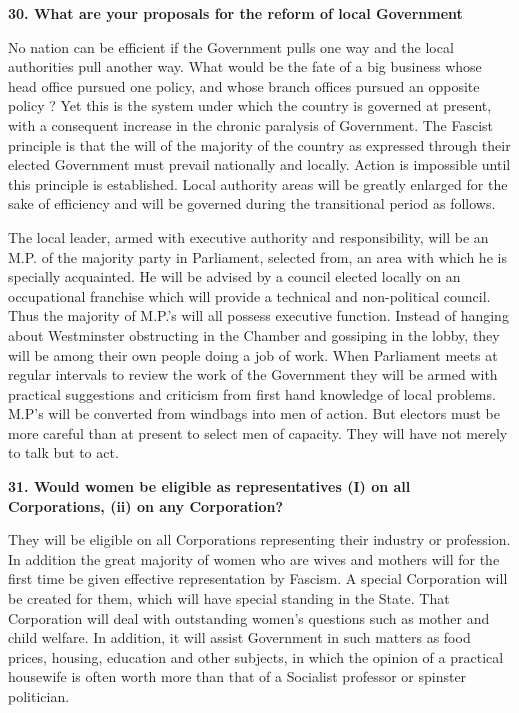\documentclass{book}
\begin{document}
\begin{flushleft}
    \textbf{30. What are your proposals for the reform of local Government}

No nation can be efficient if the Government pulls one way and the local authorities pull another
way. What would be the fate of a big business whose head office pursued one policy, and whose
branch offices pursued an opposite policy ? Yet this is the system under which the country is
governed at present, with a consequent increase in the chronic paralysis of Government. The
Fascist principle is that the will of the majority of the country as expressed through their elected
Government must prevail nationally and locally. Action is impossible until this principle is
established. Local authority areas will be greatly enlarged for the sake of efficiency and will be governed during the transitional period as follows.

The local leader, armed with executive authority and responsibility, will be an M.P. of the
majority party in Parliament, selected from, an area with which he is specially acquainted. He
will be advised by a council elected locally on an occupational franchise which will provide a
technical and non-political council. Thus the majority of M.P.'s will all possess executive
function. Instead of hanging about Westminster obstructing in the Chamber and gossiping in the lobby, they will be among their own people doing a job of work. When Parliament meets at regular intervals to review the work of the Government they will be armed with practical suggestions and criticism from first hand knowledge of local problems. M.P's will be converted from windbags into men of action. But electors must be more careful than at present to select men of capacity. They will have not merely to talk but to act.
\end{flushleft}

\begin{flushright}
    \textbf{31. Would women be eligible as representatives (I) on all Corporations, (ii) on any Corporation?}

They will be eligible on all Corporations representing their industry or profession. In addition the
great majority of women who are wives and mothers will for the first time be given effective
representation by Fascism. A special Corporation will be created for them, which will have
special standing in the State. That Corporation will deal with outstanding women's questions
such as mother and child welfare. In addition, it will assist Government in such matters as food
prices, housing, education and other subjects, in which the opinion of a practical housewife is often worth more than that of a Socialist professor or spinster politician.
\end{flushright}
\end{document}
